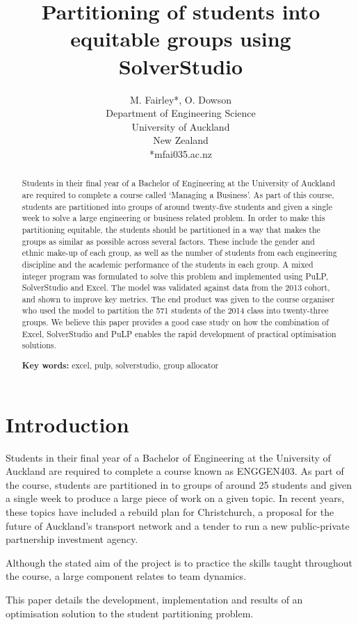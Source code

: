 \documentclass[12pt]{ORSNZ}
\title{Partitioning of students into equitable groups using SolverStudio}
\author{M. Fairley*, O. Dowson\\Department of Engineering Science\\University of
  Auckland\\New Zealand\\{*}mfai035\@@aucklanduni.ac.nz}
\date{} %
\begin{document}
\maketitle
\pagestyle{empty} \thispagestyle{empty}
\begin{abstract}
Students in their final year of a Bachelor of Engineering at the University of Auckland are required to complete a course called `Managing a Business'. As part of this course, students are partitioned into groups of around twenty-five students and given a single week to solve a large engineering or business related problem. In order to make this partitioning equitable, the students should be partitioned in a way that makes the groups as similar as possible across several factors. These include the gender and ethnic make-up of each group, as well as the number of students from each engineering discipline and the academic performance of the students in each group. A mixed integer program was formulated to solve this problem and implemented using PuLP, SolverStudio and Excel. The model was validated against data from the 2013 cohort, and shown to improve key metrics. The end product was given to the course organiser who used the model to partition the 571 students of the 2014 class into twenty-three groups. We believe this paper provides a good case study on how the combination of Excel, SolverStudio and PuLP enables the rapid development of practical optimisation solutions.

\textbf{Key words:} excel, pulp, solverstudio, group allocator
\end{abstract}

\section{Introduction}
Students in their final year of a Bachelor of Engineering at the University of Auckland are required to complete a course known as ENGGEN403. As part of the course, students are partitioned in to groups of around 25 students and given a single week to produce a large piece of work on a given topic. In recent years, these topics have included a rebuild plan for Christchurch, a proposal for the future of Auckland’s transport network and a tender to run a new public-private partnership investment agency.

Although the stated aim of the project is to practice the skills taught throughout the course, a large component relates to team dynamics. 

This paper details the development, implementation and results of an optimisation solution to the student partitioning problem. 
\end{document}
